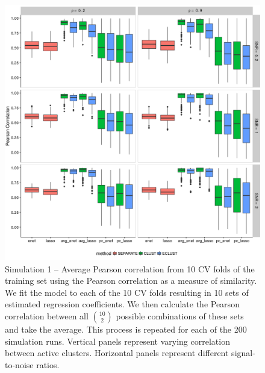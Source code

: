 \begin{figure}[H]
	\centering
	\includegraphics[scale=0.6, keepaspectratio]{./figs/hydra/results/figures/sim1-sept10/pearson_Correlation_sim1.png}
	\caption{Simulation 1 -- Average Pearson correlation from 10 CV folds of the training set using the Pearson correlation as a measure of similarity. We fit the model to each of the 10 CV folds resulting in 10 sets of estimated regression coefficients. We then calculate the Pearson correlation between all $\binom{10}{2}$ possible combinations of these sets and take the average. This process is repeated for each of the 200 simulation runs. Vertical panels represent varying correlation between active clusters. Horizontal panels represent different signal-to-noise ratios.}
	\label{fig:pearson_Correlation_sim1}
\end{figure}

